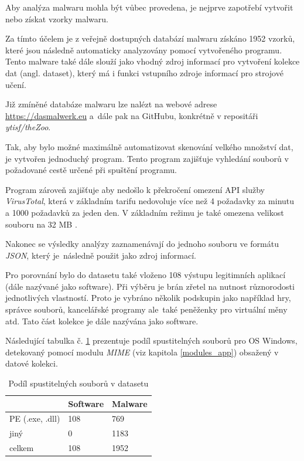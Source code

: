 Aby analýza malwaru mohla být vůbec provedena, je nejprve zapotřebí vytvořit nebo získat vzorky malwaru. 

Za tímto účelem je z veřejně dostupných databází malwaru získáno 1952 vzorků, které jsou následně automaticky analyzovány pomocí vytvořeného programu. Tento malware také dále slouží jako vhodný zdroj informací pro vytvoření kolekce dat (angl. dataset), který má i funkci vstupního zdroje informací pro strojové učení. 

Již zmíněné databáze malwaru lze nalézt na webové adrese \url{https://dasmalwerk.eu} a~dále pak na GitHubu, konkrétně v repositáři \emph{ytisf/theZoo}.

Tak, aby bylo možné maximálně automatizovat skenování velkého množství dat, je vytvořen jednoduchý program. Tento program zajišťuje vyhledání souborů v požadované cestě určené při spuštění programu.

Program zároveň zajišťuje aby nedošlo k překročení omezení API služby \emph{VirusTotal}, která v základním tarifu nedovoluje více než 4 požadavky za minutu a 1000 požadavků za jeden den. V základním režimu je také omezena velikost souboru na 32 MB \cite{virustotal_limit}.

Nakonec se výsledky analýzy zaznamenávají do jednoho souboru ve formátu \emph{JSON}, který je~následně použit jako zdroj informací.

Pro porovnání bylo do datasetu také vloženo 108 výstupu legitimních aplikací (dále nazývané jako software). Při výběru je brán zřetel na nutnost různorodosti jednotlivých vlastností. Proto je vybráno několik podskupin jako například hry, správce souborů, kancelářské programy ale~také peněženky pro virtuální měny atd. Tato část kolekce je dále nazývána jako software.



Následující tabulka č. \ref{table:mimetypes_table} prezentuje podíl spustitelných souborů pro OS Windows, detekovaný pomocí modulu \emph{MIME} (viz kapitola \ref{modules_app}) obsažený v datové kolekci.

\begin{table}[H]
    \caption{Podíl spustitelných souborů v datasetu}
    \label{table:mimetypes_table}
    
    \centering
    \begin{tabular}{|l|l|l|}
        \hline
                            & Software & Malware       \\
        \hline
    	\hline
        PE (.exe, .dll)      & 108     & 769   \\ \hline
        jiný                 & 0       & 1183  \\ \hline
        celkem               & 108     & 1952  \\ \hline
    \end{tabular}
\end{table}

